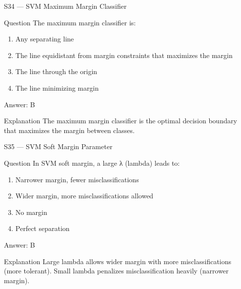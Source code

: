 \documentclass[aspectratio=169,8pt]{beamer}
\begin{document}
	\begin{frame}{S34 --- SVM Maximum Margin Classifier}
		\begin{block}{Question}
			The maximum margin classifier is:
			\begin{enumerate}
				\item Any separating line
				\item The line equidistant from margin constraints that maximizes the margin
				\item The line through the origin
				\item The line minimizing margin
			\end{enumerate}
		\end{block}
		\begin{exampleblock}{Answer: B}\end{exampleblock}
		\begin{block}{Explanation}
			The maximum margin classifier is the optimal decision boundary that maximizes the margin between classes.
		\end{block}
	\end{frame}
	
	\begin{frame}{S35 --- SVM Soft Margin Parameter}
		\begin{block}{Question}
			In SVM soft margin, a large λ (lambda) leads to:
			\begin{enumerate}
				\item Narrower margin, fewer misclassifications
				\item Wider margin, more misclassifications allowed
				\item No margin
				\item Perfect separation
			\end{enumerate}
		\end{block}
		\begin{exampleblock}{Answer: B}\end{exampleblock}
		\begin{block}{Explanation}
			Large lambda allows wider margin with more misclassifications (more tolerant). Small lambda penalizes misclassification heavily (narrower margin).
		\end{block}
	\end{frame}
	
\end{document}
